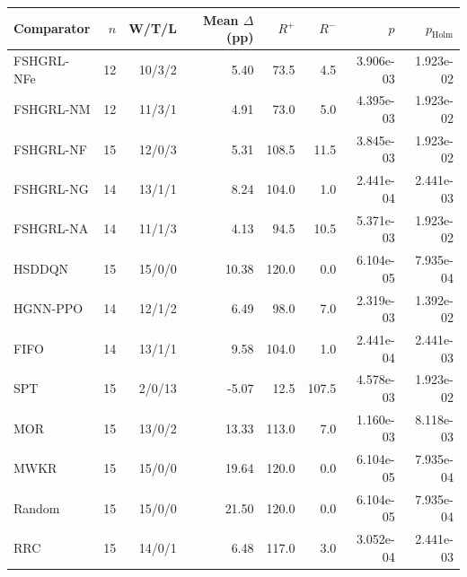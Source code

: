 \begin{tabular}{lrrrrrrr}
\toprule
Comparator & $n$ & W/T/L & Mean $\Delta$ (pp) & $R^+$ & $R^-$ & $p$ & $p_{\mathrm{Holm}}$ \\
\midrule
FSHGRL-NFe & 12 & 10/3/2 & 5.40 & 73.5 & 4.5 & 3.906e-03 & 1.923e-02 \\
FSHGRL-NM & 12 & 11/3/1 & 4.91 & 73.0 & 5.0 & 4.395e-03 & 1.923e-02 \\
FSHGRL-NF & 15 & 12/0/3 & 5.31 & 108.5 & 11.5 & 3.845e-03 & 1.923e-02 \\
FSHGRL-NG & 14 & 13/1/1 & 8.24 & 104.0 & 1.0 & 2.441e-04 & 2.441e-03 \\
FSHGRL-NA & 14 & 11/1/3 & 4.13 & 94.5 & 10.5 & 5.371e-03 & 1.923e-02 \\
HSDDQN & 15 & 15/0/0 & 10.38 & 120.0 & 0.0 & 6.104e-05 & 7.935e-04 \\
HGNN-PPO & 14 & 12/1/2 & 6.49 & 98.0 & 7.0 & 2.319e-03 & 1.392e-02 \\
FIFO & 14 & 13/1/1 & 9.58 & 104.0 & 1.0 & 2.441e-04 & 2.441e-03 \\
SPT & 15 & 2/0/13 & -5.07 & 12.5 & 107.5 & 4.578e-03 & 1.923e-02 \\
MOR & 15 & 13/0/2 & 13.33 & 113.0 & 7.0 & 1.160e-03 & 8.118e-03 \\
MWKR & 15 & 15/0/0 & 19.64 & 120.0 & 0.0 & 6.104e-05 & 7.935e-04 \\
Random & 15 & 15/0/0 & 21.50 & 120.0 & 0.0 & 6.104e-05 & 7.935e-04 \\
RRC & 15 & 14/0/1 & 6.48 & 117.0 & 3.0 & 3.052e-04 & 2.441e-03 \\
\bottomrule
\end{tabular}
